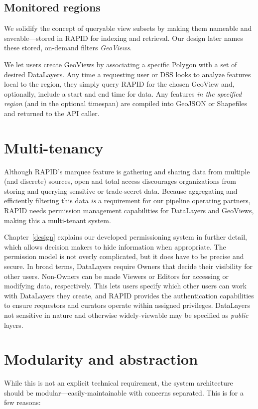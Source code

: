 \subsection{Monitored regions}
We solidify the concept of queryable view subsets by making them nameable and saveable---stored in RAPID for indexing and retrieval. Our design later names these stored, on-demand filters \textit{GeoViews}.

We let users create GeoViews by associating a specific Polygon with a set of desired DataLayers. Any time a requesting user or DSS looks to analyze features local to the region, they simply query RAPID for the chosen GeoView and, optionally, include a start and end time for data. Any features \textit{in the specified region} (and in the optional timespan) are compiled into GeoJSON or Shapefiles and returned to the API caller.

\section{Multi-tenancy}
Although RAPID's marquee feature is gathering and sharing data from multiple (and discrete) sources, open and total access discourages organizations from storing and querying sensitive or trade-secret data. Because aggregating and efficiently filtering this data \textit{is} a requirement for our pipeline operating partners, RAPID needs permission management capabilities for DataLayers and GeoViews, making this a multi-tenant system.

Chapter~\ref{design} explains our developed permissioning system in further detail, which allows decision makers to hide information when appropriate. The permission model is not overly complicated, but it does have to be precise and secure. In broad terms, DataLayers require Owners that decide their visibility for other users. Non-Owners can be made Viewers or Editors for accessing or modifying data, respectively. This lets users specify which other users can work with DataLayers they create, and RAPID provides the authentication capabilities to ensure requestors and curators operate within assigned privileges. DataLayers not sensitive in nature and otherwise widely-viewable may be specified as \textit{public} layers.

\section{Modularity and abstraction}
While this is not an explicit technical requirement, the system architecture should be modular---easily-maintainable with concerns separated. This is for a few reasons:

